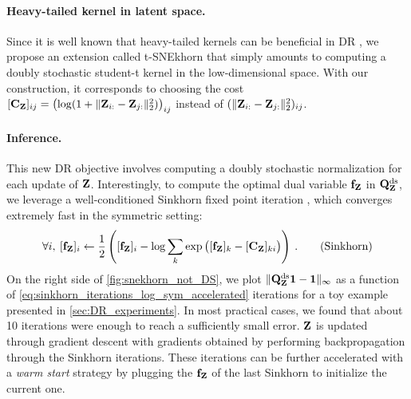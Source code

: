 \paragraph{Heavy-tailed kernel in latent space.}
Since it is well known that heavy-tailed kernels can be beneficial in DR
\cite{kobak2020heavy}, we propose an extension called t-SNEkhorn that
simply amounts to computing a doubly stochastic student-t kernel 
in the low-dimensional space. With our construction, it corresponds to choosing the cost $[\mathbf{C}_{\mathbf{Z}}]_{ij} = \left(\log(1 + \|\mathbf{Z}_{i:}-\mathbf{Z}_{j:}\|_2^2)\right)_{ij}$
instead of $(\|\mathbf{Z}_{i:}-\mathbf{Z}_{j:}\|_2^2)_{ij}$.

\paragraph{Inference.}
This new DR objective involves computing a doubly stochastic normalization for each update of $\mathbf{Z}$. Interestingly, to compute the optimal dual variable $\mathbf{f}_{\mathbf{Z}}$ in $\mathbf{Q}^{\mathrm{ds}}_{\mathbf{Z}}$, we leverage a well-conditioned Sinkhorn fixed point iteration \citep{knight2014symmetry, feydy2019interpolating}, which converges extremely fast in the symmetric setting:
\begin{equation}\label{eq:sinkhorn_iterations_log_sym_accelerated}
    \forall i, \: 
    [\mathbf{f}_{\mathbf{Z}}]_i \leftarrow \frac{1}{2} \left( [\mathbf{f}_{\mathbf{Z}}]_i - \log \sum_{k} \exp \big([\mathbf{f}_{\mathbf{Z}}]_k - [\mathbf{C}_{\mathbf{Z}}]_{ki} \big) \right) \:.
\tag{Sinkhorn}
\end{equation}
On the right side of \cref{fig:snekhorn_not_DS}, we plot $\| \mathbf{Q}^{\mathrm{ds}}_{\mathbf{Z}} \bm{1} - \bm{1} \|_{\infty}$ as a function of \eqref{eq:sinkhorn_iterations_log_sym_accelerated} iterations for a toy example presented in \cref{sec:DR_experiments}. In most practical cases, we found that about 10 iterations were enough to reach a sufficiently small error. 
$\mathbf{Z}$ is updated through gradient descent with gradients obtained by performing backpropagation through the Sinkhorn iterations. These
iterations can be further accelerated with a \emph{warm start} strategy by plugging the $\mathbf{f}_{\mathbf{Z}}$ of the last Sinkhorn to initialize the current one.


